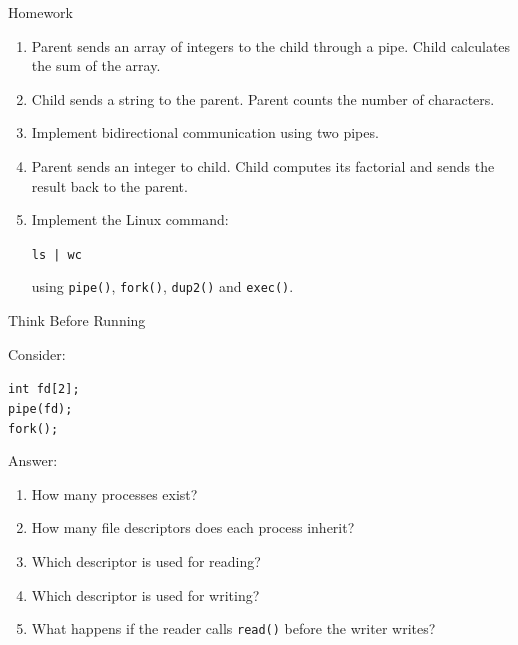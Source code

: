 \documentclass[aspectratio=169]{beamer}
\begin{document}
\begin{frame}{Homework}

\begin{enumerate}

    \item Parent sends an array of integers to the child through a pipe.
    Child calculates the sum of the array.

    \item Child sends a string to the parent.
    Parent counts the number of characters.

    \item Implement bidirectional communication using two pipes.

    \item Parent sends an integer to child.
    Child computes its factorial and sends the result back to the parent.

    \item Implement the Linux command:
    \begin{center}
    \texttt{ls | wc}
    \end{center}
    using \texttt{pipe()}, \texttt{fork()}, \texttt{dup2()} and
    \texttt{exec()}.

\end{enumerate}

\end{frame}

\begin{frame}{Think Before Running}

Consider:

\begin{center}
\texttt{int fd[2];}\\
\texttt{pipe(fd);}\\
\texttt{fork();}
\end{center}

Answer:

\begin{enumerate}
    \item How many processes exist?
    \item How many file descriptors does each process inherit?
    \item Which descriptor is used for reading?
    \item Which descriptor is used for writing?
    \item What happens if the reader calls \texttt{read()} before the writer
    writes?
\end{enumerate}

\end{frame}
\end{document}
